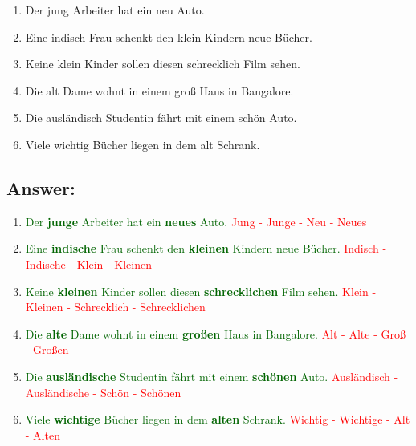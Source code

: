 \documentclass[12pt]{article}
\begin{document}
\begin{enumerate}
\item Der jung\underline{\hspace{1cm}} Arbeiter hat ein neu\underline{\hspace{1cm}} Auto.
\item Eine indisch\underline{\hspace{1cm}} Frau schenkt den klein\underline{\hspace{1cm}} Kindern neue Bücher.
\item Keine klein\underline{\hspace{1cm}} Kinder sollen diesen schrecklich\underline{\hspace{1cm}} Film sehen.
\item Die alt\underline{\hspace{1cm}} Dame wohnt in einem groß\underline{\hspace{1cm}} Haus in Bangalore.
\item Die ausländisch\underline{\hspace{1cm}} Studentin fährt mit einem schön\underline{\hspace{1cm}} Auto.
\item Viele wichtig\underline{\hspace{1cm}} Bücher liegen in dem alt\underline{\hspace{1cm}} Schrank.
\end{enumerate}

\subsection*{Answer:}
\begin{enumerate}
    \item \textcolor{darkgreen}{Der \textbf{junge} Arbeiter hat ein \textbf{neues} Auto.} \textcolor{red}{Jung - Junge - Neu - Neues}
    \item \textcolor{darkgreen}{Eine \textbf{indische} Frau schenkt den \textbf{kleinen} Kindern neue Bücher.} \textcolor{red}{Indisch - Indische - Klein - Kleinen}
    \item \textcolor{darkgreen}{Keine \textbf{kleinen} Kinder sollen diesen \textbf{schrecklichen} Film sehen.} \textcolor{red}{Klein - Kleinen - Schrecklich - Schrecklichen}
    \item \textcolor{darkgreen}{Die \textbf{alte} Dame wohnt in einem \textbf{großen} Haus in Bangalore.} \textcolor{red}{Alt - Alte - Groß - Großen}
    \item \textcolor{darkgreen}{Die \textbf{ausländische} Studentin fährt mit einem \textbf{schönen} Auto.} \textcolor{red}{Ausländisch - Ausländische - Schön - Schönen}
    \item \textcolor{darkgreen}{Viele \textbf{wichtige} Bücher liegen in dem \textbf{alten} Schrank.} \textcolor{red}{Wichtig - Wichtige - Alt - Alten}
\end{enumerate}
\end{document}
